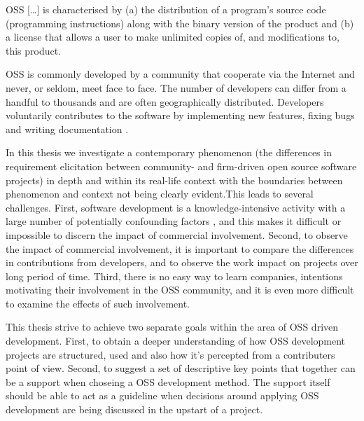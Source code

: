 \documentclass[a4paper,11pt]{article}
\begin{document}
{%
\begin{displayquote}
OSS [\dots] is characterised by (a) the distribution of a program's source code (programming instructions) along with the binary version of the product and (b) a license that allows a user to make unlimited copies of, and modifications to, this product. \cite{DiBonaChrisandOckman1999, Maccormack2006}
\end{displayquote}
OSS is commonly developed by a community that cooperate via the Internet and never, or seldom, meet face to face. The number of developers can differ from a handful to thousands and are often geographically distributed. Developers voluntarily contributes to the software by implementing new features, fixing bugs and writing documentation \cite{Maccormack2006}.

In this thesis we investigate a contemporary phenomenon (the differences in requirement elicitation between community- and firm-driven open source software projects) in depth and within its real-life context with the boundaries between phenomenon and context not being clearly evident\cite{RobertK1994}.This leads to several challenges. First, software development is a knowledge-intensive activity with a large number of potentially confounding factors \cite{Curtis1986}, and this makes it difficult or impossible to discern the impact of commercial involvement. Second, to observe the impact of commercial involvement, it is important to compare the differences in contributions from developers, and to observe the work impact on projects over long period of time. Third, there is no easy way to learn companies, intentions motivating their involvement in the OSS community, and it is even more difficult to examine the effects of such involvement. 


This thesis strive to achieve two separate goals within the area of OSS driven development. First, to obtain a deeper understanding of how OSS development projects are structured, used and also how it's percepted from a contributers point of view. Second, to suggest a set of descriptive key points that together can be a support when choseing a OSS development method. The support itself should be able to act as a guideline when decisions around applying OSS development are being discussed in the upstart of a project.

}
\end{document}
